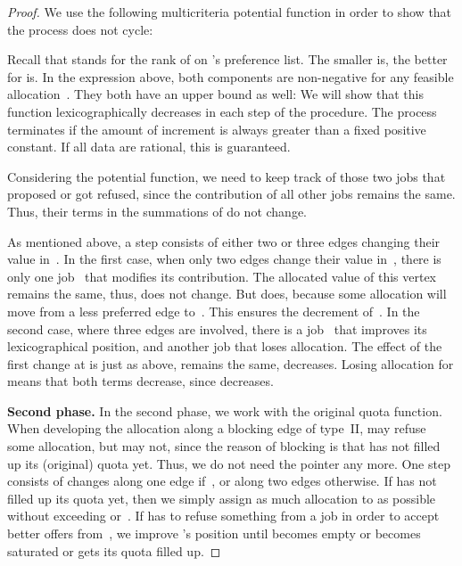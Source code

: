 \documentclass{llncs}
\begin{document}
\begin{proof}
We use the following multicriteria potential function in order to show that the process does not cycle:


Recall that  stands for the rank of  on 's preference list. The smaller  is, the better  for  is. In the expression above, both components are non-negative for any feasible allocation~. They both have an upper bound as well:  We will show that this function lexicographically decreases in each step of the procedure. The process terminates if the amount of increment is always greater than a fixed positive constant. If all data are rational, this is guaranteed.

Considering the potential function, we need to keep track of those two jobs that proposed or got refused, since the contribution of all other jobs remains the same. Thus, their terms in the summations of  do not change.

As mentioned above, a step consists of either two or three edges changing their value in~. In the first case, when only two edges change their value in~, there is only one job~ that modifies its contribution. The allocated value of this vertex remains the same, thus,  does not change. But  does, because some allocation will move from a less preferred edge to~. This ensures the decrement of~. In the second case, where three edges are involved, there is a job~ that improves its lexicographical position, and another job  that loses allocation. The effect of the first change at  is just as above,  remains the same,  decreases. Losing allocation for  means that both terms decrease, since  decreases.

\textbf{Second phase.}
In the second phase, we work with the original quota function. When developing the allocation along a blocking edge  of type~II,  may refuse some allocation, but  may not, since the reason of blocking is that  has not filled up its (original) quota yet. Thus, we do not need the pointer  any more. One step consists of changes along one edge if~, or along two edges otherwise. If  has not filled up its quota yet, then we simply assign as much allocation to  as possible without exceeding  or~. If  has to refuse something from a job  in order to accept better offers from~, we improve 's position until  becomes empty or  becomes saturated or  gets its quota filled up.


\end{proof}
\end{document}
